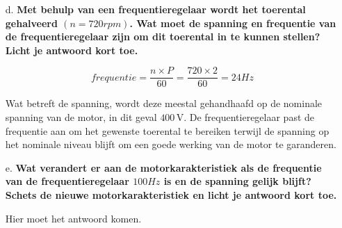 \begin{enumerate}
    \item [d.] \textbf{Met behulp van een frequentieregelaar wordt het toerental gehalveerd $(n = 720 rpm)$. Wat moet de spanning en frequentie van de frequentieregelaar zijn om dit toerental in te kunnen stellen? Licht je antwoord kort toe.} 
        
        \[ frequentie 
        = \frac{n \times P}{60} 
        = \frac{720 \times 2}{60} 
        = 24 Hz \]
        
        Wat betreft de spanning, wordt deze meestal gehandhaafd op de nominale spanning van de motor, in dit geval \( 400 \, \text{V} \). De frequentieregelaar past de frequentie aan om het gewenste toerental te bereiken terwijl de spanning op het nominale niveau blijft om een goede werking van de motor te garanderen.
    

    \item [e.] \textbf{Wat verandert er aan de motorkarakteristiek als de frequentie van de frequentieregelaar $100 Hz$ is en de spanning gelijk blijft?
    Schets de nieuwe motorkarakteristiek en licht je antwoord kort toe.}

        Hier moet het antwoord komen.

\end{enumerate}